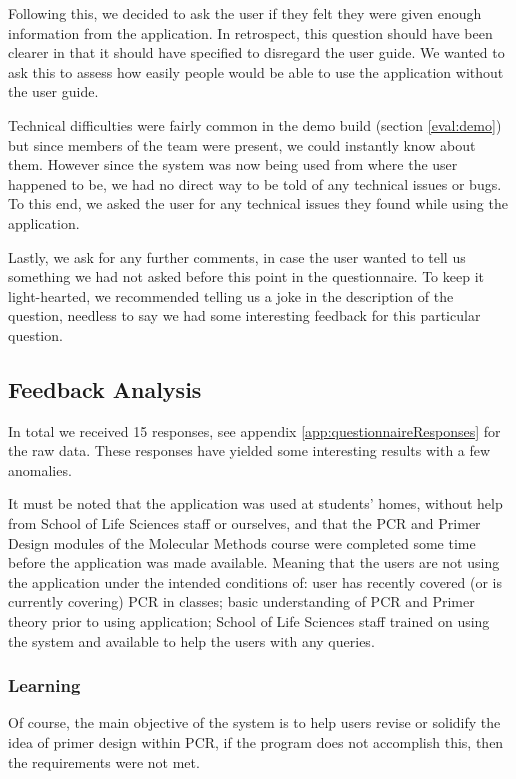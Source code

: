 Following this, we decided to ask the user if they felt they were
given enough information from the application.
In retrospect, this question should have been clearer in that it
should have specified to disregard the user guide.
We wanted to ask this to assess how easily people would be able to use
the application without the user guide.

Technical difficulties were fairly common in the demo build (section
\ref{eval:demo}) but since members of the team were present, we could
instantly know about them.
However since the system was now being used from where the user
happened to be, we had no direct way to be told of any technical
issues or bugs.
To this end, we asked the user for any technical issues they found
while using the application.

Lastly, we ask for any further comments, in case the user wanted to
tell us something we had not asked before this point in the
questionnaire.
To keep it light-hearted, we recommended telling us a joke in the
description of the question, needless to say we had some interesting
feedback for this particular question.

\subsection{Feedback Analysis}

In total we received 15 responses, see appendix
\ref{app:questionnaireResponses} for the raw data.
These responses have yielded some interesting results with a few
anomalies.

It must be noted that the application was used at students' homes,
without help from School of Life Sciences staff or ourselves, and that
the PCR and Primer Design modules of the Molecular Methods course were
completed some time before the application was made available.
Meaning that the users are not using the application under the
intended conditions of: user has recently covered (or is currently
covering) PCR in classes; basic understanding of PCR and Primer theory
prior to using application; School of Life Sciences staff trained on
using the system and available to help the users with any queries.

\subsubsection{Learning}

Of course, the main objective of the system is to help users revise or
solidify the idea of primer design within PCR, if the program does not
accomplish this, then the requirements were not met.

